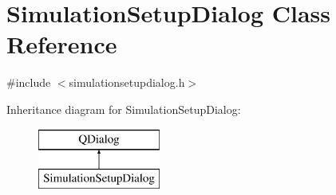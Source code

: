 \hypertarget{class_simulation_setup_dialog}{}\section{Simulation\+Setup\+Dialog Class Reference}
\label{class_simulation_setup_dialog}


{\ttfamily \#include $<$simulationsetupdialog.\+h$>$}

Inheritance diagram for Simulation\+Setup\+Dialog\+:\begin{figure}[H]
\begin{center}
\leavevmode
\includegraphics[height=2.000000cm]{d2/d3a/class_simulation_setup_dialog}
\end{center}
\end{figure}
